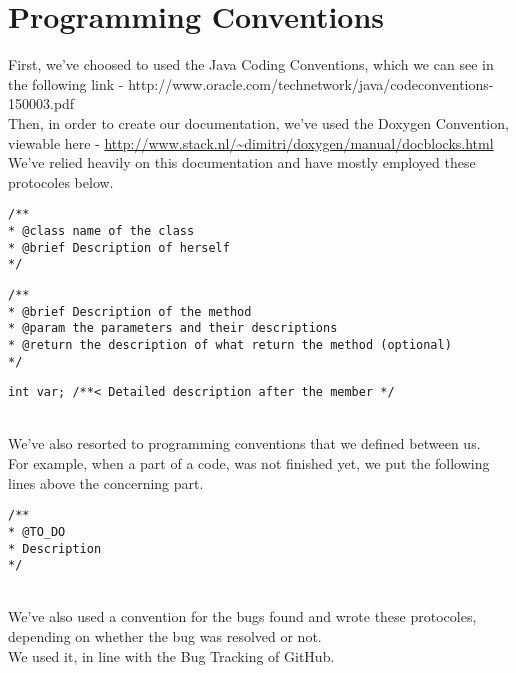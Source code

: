 \section{Programming Conventions}
First, we've choosed to used the Java Coding Conventions, which we can see in the following link - http://www.oracle.com/technetwork/java/codeconventions-150003.pdf\\

Then, in order to create our documentation, we've used the Doxygen Convention, viewable here - \url{http://www.stack.nl/~dimitri/doxygen/manual/docblocks.html}\\
We've relied heavily on this documentation and have mostly employed these protocoles below.\\

\begin{lstlisting}[frame=trBL, title=Doxygen Convention for classes]
/**
* @class name of the class
* @brief Description of herself
*/
\end{lstlisting}

\begin{lstlisting}[frame=trBL, title=Doxygen Convention for methods]
/**
* @brief Description of the method
* @param the parameters and their descriptions
* @return the description of what return the method (optional)
*/
\end{lstlisting}

\begin{lstlisting}[frame=trBL, title=Doxygen Convention for members]
int var; /**< Detailed description after the member */
\end{lstlisting}
~\\
We've also resorted to programming conventions that we defined between us.\\
For example, when a part of a code, was not finished yet, we put the following lines above the concerning part.\\

\begin{lstlisting}[frame=trBL, title=Programming convention for unfinished code]
/**
* @TO_DO
* Description
*/
\end{lstlisting}
~\\
We've also used a convention for the bugs found and wrote these protocoles, depending on whether the bug was resolved or not.\\
We used it, in line with the Bug Tracking of GitHub.\\

